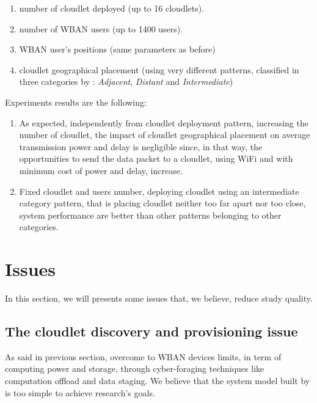 \documentclass[sigchi]{acmart}
\begin{document}
\begin{enumerate}
\item number of cloudlet deployed (up to 16 cloudlets).
\item number of WBAN users (up to 1400 users).
\item WBAN user's positions (same parameters as before)
\item cloudlet geographical placement (using very different patterns, classified in three categories by \citet{MSAReport}: \textit{Adjacent}, \textit{Distant} and \textit{Intermediate})
\end{enumerate}

Experiments results are the following:

\begin{enumerate}

\item As expected, independently from cloudlet deployment pattern, increasing the number of cloudlet, the impact of cloudlet geographical placement on average transmission power and delay is negligible since, in that way, the opportunities to send the data packet to a cloudlet, using WiFi and with minimum cost of power and delay, increase.

\item Fixed cloudlet and users number, deploying cloudlet using an intermediate category pattern, that is placing cloudlet neither too far apart nor too close, system performance are better than other patterns belonging to other categories.

\end{enumerate}

\section{Issues}

In this section, we will presents some issues that, we believe, reduce \citep{MSAReport} study quality.

\subsection{The cloudlet discovery and provisioning issue}

As said in previous section, \citet{MSAReport} overcome to WBAN devices limits, in term of computing power and storage, through cyber-foraging techniques like computation offload and data staging. We believe that the system model built by \citet{MSAReport} is too simple to achieve research's goals.
\end{document}
